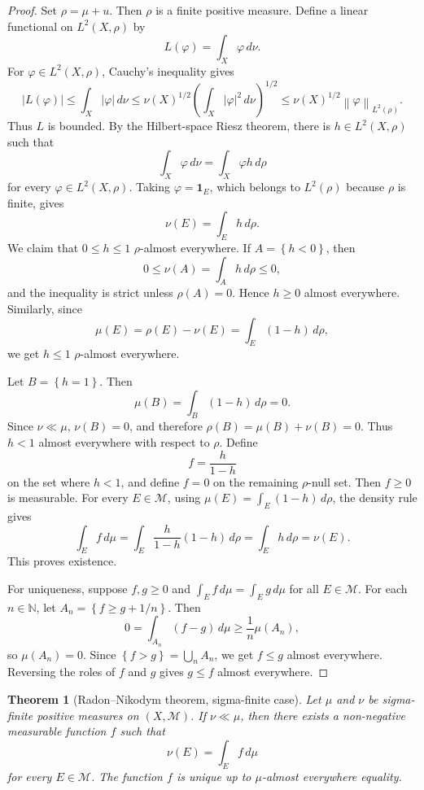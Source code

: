 \documentclass[11pt,openany]{book}
\numberwithin{equation}{chapter}
\theoremstyle{definition}
\theoremstyle{plain}
\newtheorem{theorem}[definition]{Theorem}
\theoremstyle{remark}
\newcommand{\N}{\mathbb{N}}
\newcommand{\M}{\mathcal{M}}
\newcommand{\1}{\mathbf{1}}
\newcommand{\dd}{\,d}
\newcommand{\abs}[1]{\left\lvert #1\right\rvert}
\newcommand{\norm}[1]{\left\lVert #1\right\rVert}
\newcommand{\set}[1]{\left\{#1\right\}}
\begin{document}
\begin{proof}
Set \(\rho=\mu+
u\). Then \(\rho\) is a finite positive measure. Define a linear functional on \(L^2(X,\rho)\) by
\[
  L(\varphi)=\int_X\varphi\dd\nu.
\]
For \(\varphi\in L^2(X,\rho)\), Cauchy's inequality gives
\[
  \abs{L(\varphi)}
  \leq \int_X\abs{\varphi}\dd\nu
  \leq \nu(X)^{1/2}\left(\int_X\abs{\varphi}^2\dd\nu\right)^{1/2}
  \leq \nu(X)^{1/2}\norm{\varphi}_{L^2(\rho)}.
\]
Thus \(L\) is bounded. By the Hilbert-space Riesz theorem, there is \(h\in L^2(X,\rho)\) such that
\[
  \int_X\varphi\dd\nu=\int_X\varphi h\dd\rho
\]
for every \(\varphi\in L^2(X,\rho)\). Taking \(\varphi=\1_E\), which belongs to \(L^2(\rho)\) because \(\rho\) is finite, gives
\[
  \nu(E)=\int_E h\dd\rho.
\]
We claim that \(0\leq h\leq1\) \(\rho\)-almost everywhere. If \(A=\set{h<0}\), then
\[
  0\leq\nu(A)=\int_Ah\dd\rho\leq0,
\]
and the inequality is strict unless \(\rho(A)=0\). Hence \(h\geq0\) almost everywhere. Similarly, since
\[
  \mu(E)=\rho(E)-\nu(E)=\int_E(1-h)\dd\rho,
\]
we get \(h\leq1\) \(\rho\)-almost everywhere.

Let \(B=\set{h=1}\). Then
\[
  \mu(B)=\int_B(1-h)\dd\rho=0.
\]
Since \(\nu\ll\mu\), \(\nu(B)=0\), and therefore \(\rho(B)=\mu(B)+\nu(B)=0\). Thus \(h<1\) almost everywhere with respect to \(\rho\). Define
\[
  f=\frac{h}{1-h}
\]
on the set where \(h<1\), and define \(f=0\) on the remaining \(\rho\)-null set. Then \(f\geq0\) is measurable. For every \(E\in\M\), using \(\mu(E)=\int_E(1-h)\dd\rho\), the density rule gives
\[
  \int_E f\dd\mu
  =\int_E \frac{h}{1-h}(1-h)\dd\rho
  =\int_E h\dd\rho
  =\nu(E).
\]
This proves existence.

For uniqueness, suppose \(f,g\geq0\) and \(\int_Ef\dd\mu=\int_Eg\dd\mu\) for all \(E\in\M\). For each \(n\in\N\), let \(A_n=\set{f\geq g+1/n}\). Then
\[
  0=\int_{A_n}(f-g)\dd\mu\geq \frac{1}{n}\mu(A_n),
\]
so \(\mu(A_n)=0\). Since \(\set{f>g}=\bigcup_nA_n\), we get \(f\leq g\) almost everywhere. Reversing the roles of \(f\) and \(g\) gives \(g\leq f\) almost everywhere.
\end{proof}

\begin{theorem}[Radon--Nikodym theorem, sigma-finite case]
Let \(\mu\) and \(\nu\) be sigma-finite positive measures on \((X,\M)\). If \(\nu\ll\mu\), then there exists a non-negative measurable function \(f\) such that
\[
  \nu(E)=\int_E f\dd\mu
\]
for every \(E\in\M\). The function \(f\) is unique up to \(\mu\)-almost everywhere equality.
\end{theorem}
\end{document}
